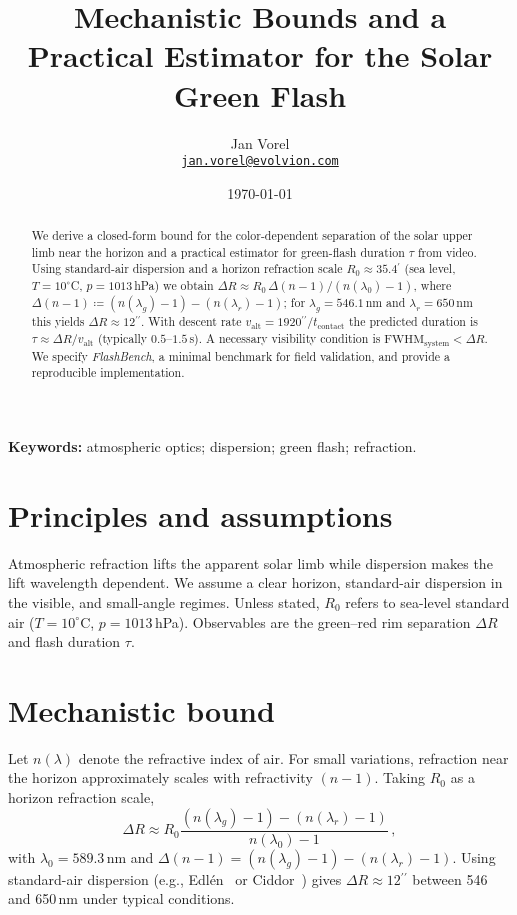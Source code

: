 \documentclass[10pt]{article}
\title{Mechanistic Bounds and a Practical Estimator for the Solar Green Flash}
\author{%
  Jan Vorel\\
  \texttt{\href{mailto:jan.vorel@evolvion.com}{jan.vorel@evolvion.com}}
}
\date{\today}
\newcommand{\arcmin}{\ensuremath{^{\prime}}}
\newcommand{\arcsec}{\ensuremath{^{\prime\prime}}}
\begin{document}
\maketitle

\begin{abstract}
We derive a closed-form bound for the color-dependent separation of the solar upper limb near the horizon and a practical estimator for green-flash duration $\tau$ from video. Using standard-air dispersion and a horizon refraction scale $R_0\!\approx\!35.4\arcmin$ (sea level, $T{=}10^\circ$C, $p{=}1013$\,hPa) we obtain
$\Delta R \approx R_0\,{\Delta(n-1)}/{(n(\lambda_0)-1)}$, where $\Delta(n-1)\coloneqq (n(\lambda_g)-1)-(n(\lambda_r)-1)$; for $\lambda_g\!=\!546.1$\,nm and $\lambda_r\!=\!650$\,nm this yields $\Delta R\!\approx\!12\arcsec$. With descent rate $v_{\mathrm{alt}}\!=\!1920\arcsec/t_{\mathrm{contact}}$ the predicted duration is $\tau\!\approx\!\Delta R/v_{\mathrm{alt}}$ (typically $0.5$--$1.5$\,s). A necessary visibility condition is $\mathrm{FWHM}_{\mathrm{system}}\!<\!\Delta R$. We specify \emph{FlashBench}, a minimal benchmark for field validation, and provide a reproducible implementation.
\end{abstract}

\noindent\textbf{Keywords:} atmospheric optics; dispersion; green flash; refraction.

\section{Principles and assumptions}
Atmospheric refraction lifts the apparent solar limb while dispersion makes the lift wavelength dependent. We assume a clear horizon, standard-air dispersion in the visible, and small-angle regimes. Unless stated, $R_0$ refers to sea-level standard air ($T{=}10^\circ$C, $p{=}1013$\,hPa). Observables are the green--red rim separation $\Delta R$ and flash duration $\tau$.

\section{Mechanistic bound}
Let $n(\lambda)$ denote the refractive index of air. For small variations, refraction near the horizon approximately scales with refractivity $(n-1)$. Taking $R_0$ as a horizon refraction scale,
\begin{equation}
\Delta R \approx R_0\frac{(n(\lambda_g)-1)-(n(\lambda_r)-1)}{n(\lambda_0)-1}\,,
\end{equation}
with $\lambda_0=589.3$\,nm and $\Delta(n-1)=(n(\lambda_g)-1)-(n(\lambda_r)-1)$. Using standard-air dispersion (e.g., Edl\'en~\cite{Edlen1966} or Ciddor~\cite{Ciddor1996}) gives $\Delta R\approx 12\arcsec$ between 546 and 650\,nm under typical conditions.
\end{document}
